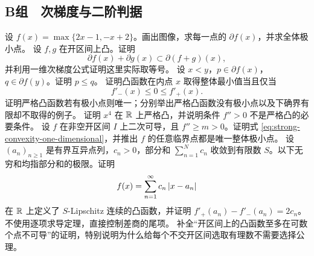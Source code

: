 \subsection*{B组　次梯度与二阶判据}
\begin{enumerate}[label=\textbf{\thechapter.\arabic*.},resume]
  设 \(f(x)=\max\{2x-1,-x+2\}\)。画出图像，求每一点的 \(\partial f(x)\)，并求全体极小点。
  设 \(f,g\) 在开区间上凸。证明
 \[
  \partial f(x)+\partial g(x)\subset\partial(f+g)(x),
 \]
 并利用一维次梯度公式证明这里实际取等号。
  设 \(x<y\)，\(p\in\partial f(x)\)，\(q\in\partial f(y)\)。证明 \(p\le q\)。
  证明凸函数在内点 \(x\) 取得整体最小值当且仅当
 \[
  f'_-(x)\le0\le f'_+(x).
 \]
  证明严格凸函数若有极小点则唯一；分别举出严格凸函数没有极小点以及下确界有限却不取得的例子。
  证明 \(x^4\) 在 \(\mathbb{R}\) 上严格凸，并说明条件 \(f''>0\) 不是严格凸的必要条件。
  设 \(f\) 在非空开区间 \(I\) 上二次可导，且 \(f''\ge m>0\)。证明式 \eqref{eq:strong-convexity-one-dimensional}，并推出 \(f\) 的任意临界点都是唯一整体极小点。
  设 \((a_n)_{n\ge1}\) 是有界互异点列，\(c_n>0\)，部分和 \(\sum_{n=1}^N c_n\) 收敛到有限数 \(S\)。以下无穷和均指部分和的极限。证明
 \[
  f(x)=\sum_{n=1}^{\infty}c_n\left|x-a_n\right|
 \]
 在 \(\mathbb{R}\) 上定义了 \(S\)-Lipschitz 连续的凸函数，并证明 \(f'_+(a_n)-f'_-(a_n)=2c_n\)。不使用逐项求导定理，直接控制差商的尾项。
  补全“开区间上的凸函数至多在可数个点不可导”的证明，特别说明为什么给每个不交开区间选取有理数不需要选择公理。
\end{enumerate}

